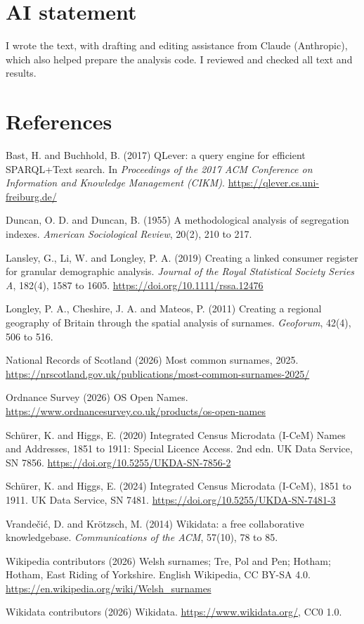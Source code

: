 \documentclass[11pt,a4paper]{article}
\begin{document}
\section*{AI statement}

I wrote the text, with drafting and editing assistance from Claude (Anthropic), which also helped prepare the analysis code. I reviewed and checked all text and results.

\section*{References}
\small
\setlength{\parskip}{0.35em}

Bast, H. and Buchhold, B. (2017) QLever: a query engine for efficient SPARQL+Text search. In \textit{Proceedings of the 2017 ACM Conference on Information and Knowledge Management (CIKM)}. \url{https://qlever.cs.uni-freiburg.de/}

Duncan, O. D. and Duncan, B. (1955) A methodological analysis of segregation indexes. \textit{American Sociological Review}, 20(2), 210 to 217.

Lansley, G., Li, W. and Longley, P. A. (2019) Creating a linked consumer register for granular demographic analysis. \textit{Journal of the Royal Statistical Society Series A}, 182(4), 1587 to 1605. \url{https://doi.org/10.1111/rssa.12476}

Longley, P. A., Cheshire, J. A. and Mateos, P. (2011) Creating a regional geography of Britain through the spatial analysis of surnames. \textit{Geoforum}, 42(4), 506 to 516.

National Records of Scotland (2026) Most common surnames, 2025. \url{https://nrscotland.gov.uk/publications/most-common-surnames-2025/}

Ordnance Survey (2026) OS Open Names. \url{https://www.ordnancesurvey.co.uk/products/os-open-names}

Schürer, K. and Higgs, E. (2020) Integrated Census Microdata (I-CeM) Names and Addresses, 1851 to 1911: Special Licence Access. 2nd edn. UK Data Service, SN 7856. \url{https://doi.org/10.5255/UKDA-SN-7856-2}

Schürer, K. and Higgs, E. (2024) Integrated Census Microdata (I-CeM), 1851 to 1911. UK Data Service, SN 7481. \url{https://doi.org/10.5255/UKDA-SN-7481-3}

Vrandečić, D. and Krötzsch, M. (2014) Wikidata: a free collaborative knowledgebase. \textit{Communications of the ACM}, 57(10), 78 to 85.

Wikipedia contributors (2026) Welsh surnames; Tre, Pol and Pen; Hotham; Hotham, East Riding of Yorkshire. English Wikipedia, CC BY-SA 4.0. \url{https://en.wikipedia.org/wiki/Welsh_surnames}

Wikidata contributors (2026) Wikidata. \url{https://www.wikidata.org/}, CC0 1.0.
\end{document}
